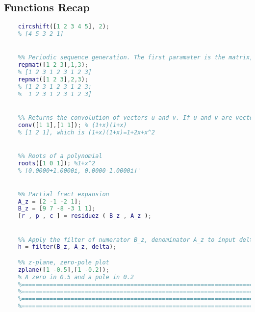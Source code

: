 \pagebreak\subsection{Functions Recap}
\begin{lstlisting}[language=Matlab, escapeinside=`']
    %% Shifting discrete signals, a positive value will shift to the right. Circular, if shifting right by n, first n values will become the last n values
    circshift([1 2 3 4 5], 2);
    % [4 5 3 2 1]


    %% Periodic sequence generation. The first paramater is the matrix, the second one is the rows repetition, the third is the cols repetition
    repmat([1 2 3],1,3);
    % [1 2 3 1 2 3 1 2 3]
    repmat([1 2 3],2,3);
    % [1 2 3 1 2 3 1 2 3;
    %  1 2 3 1 2 3 1 2 3] 


    %% Returns the convolution of vectors u and v. If u and v are vectors of polynomial coefficients, convolving them is equivalent to multiplying the two polynomials.
    conv([1 1],[1 1]); % (1+x)(1+x)
    % [1 2 1], which is (1+x)(1+x)=1+2x+x^2


    %% Roots of a polynomial
    roots([1 0 1]); %1+x^2
    % [0.0000+1.0000i, 0.0000-1.0000i]'


    %% Partial fract expansion
    A_z = [2 -1 -2 1];
    B_z = [9 7 -8 -3 1 1];
    [r , p , c ] = residuez ( B_z , A_z );


    %% Apply the filter of numerator B_z, denominator A_z to input delta
    h = filter(B_z, A_z, delta);

    %% z-plane, zero-pole plot
    zplane([1 -0.5],[1 -0.2]);
    % A zero in 0.5 and a pole in 0.2
    %==========================================================================
    %==========================================================================
    %==========================================================================
    %==========================================================================
\end{lstlisting}
